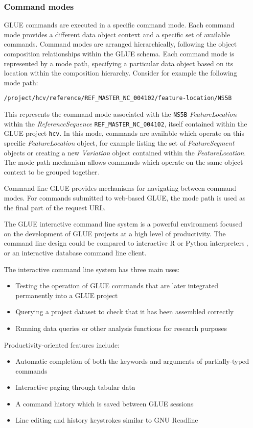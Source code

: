 
\subsubsection*{Command modes} GLUE commands are executed in a specific command
mode. Each command mode provides a different data object context and a specific
set of available commands. Command modes are arranged hierarchically, following
the object composition relationships within the GLUE schema.
Each command mode is represented by a mode path, specifying a particular data
object based on its location within the composition hierarchy.
Consider for example the following mode path:
\begin{center}
\begin{verbatim}
/project/hcv/reference/REF_MASTER_NC_004102/feature-location/NS5B
\end{verbatim}
\end{center}
This represents the command mode associated with the \texttt{NS5B}
\emph{FeatureLocation} within the \emph{ReferenceSequence} 
\texttt{REF\_MASTER\_NC\_004102}, itself contained within the GLUE project
\texttt{hcv}. In this mode, commands are available which operate on this
specific \emph{FeatureLocation} object, for example listing the
set of \emph{FeatureSegment} objects or creating a new
\emph{Variation} object contained within the \emph{FeatureLocation}. The mode
path mechanism allows commands which operate on the same object context
to be grouped together.

Command-line GLUE provides mechanisms for navigating between command modes. For
commands submitted to web-based GLUE, the mode path is used as the final part of
the request URL. 


The GLUE interactive command line system is a powerful environment focused on
the development of GLUE projects at a high level of productivity. The command line
design could be compared to interactive R or Python 
interpreters \cite{R_2017,Python_2017}, or an interactive database command line
client.

The interactive command line system has three main uses:
\begin{itemize}
  \item Testing the operation of GLUE commands that are later integrated
  permanently into a GLUE project
  \item Querying a project dataset to check that it has been assembled
  correctly
  \item Running data queries or other analysis functions for research purposes
\end{itemize} 

Productivity-oriented features include:
\begin{itemize}
  \item Automatic completion of both the keywords and arguments of partially-typed commands
  \item Interactive paging through tabular data
  \item A command history which is saved between GLUE sessions
  \item Line editing and history keystrokes similar to GNU Readline
\end{itemize}
